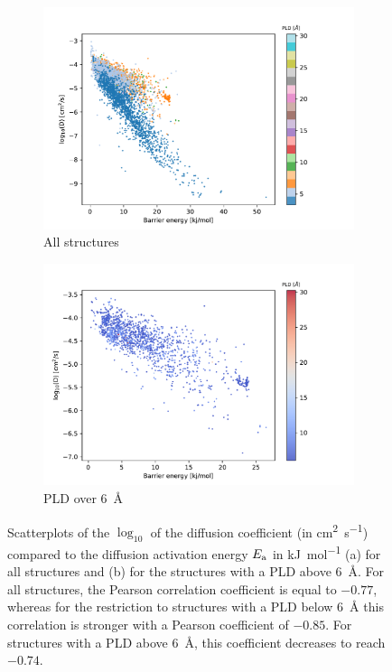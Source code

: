 \documentclass[main]{subfiles}
\begin{document}
\begin{figure}[ht]
  \centering
  \begin{subfigure}[b]{0.48\textwidth}
    \centering
    \includegraphics[width=\textwidth]{figures/5-diffusion/difflog_barrier_Df_uff.pdf}
    \caption{All structures}\label{fgr:barrier_diffusion_a}
\end{subfigure}
  \hfill
  \begin{subfigure}[b]{0.48\textwidth}
      \centering
      \includegraphics[width=\textwidth]{figures/5-diffusion/difflog_barrier_Df_uff_2.pdf}
      \caption{PLD over \SI{6}{\angstrom}}\label{fgr:barrier_diffusion_b}
  \end{subfigure}
    \caption{ Scatterplots of the $\log_{10}$ of the diffusion coefficient (in \si{\square\cm\per\s}) compared to the diffusion activation energy $E_{\text{a}}$ in \si{\kJ\per\mol} (a) for all structures  and (b) for the structures with a PLD above \SI{6}{\angstrom}. For all structures, the Pearson correlation coefficient is equal to $-0.77$, whereas for the restriction to structures with a PLD below \SI{6}{\angstrom} this correlation is stronger with a Pearson coefficient of $-0.85$. For structures with a PLD above \SI{6}{\angstrom}, this coefficient decreases to reach $-0.74$.}\label{fgr:barrier_diffusion}
\end{figure}
\end{document}
